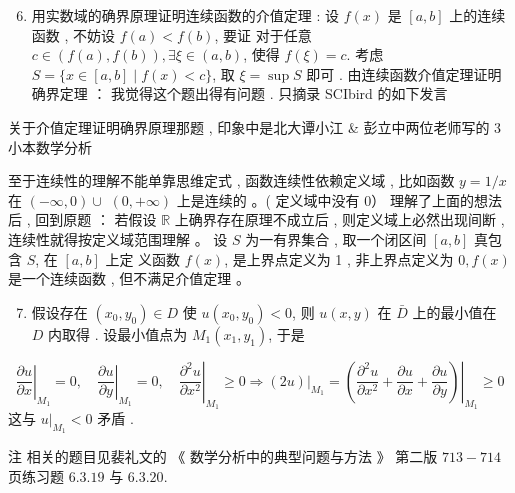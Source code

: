 \documentclass[10pt]{article}
\begin{document}
\begin{enumerate}
  \setcounter{enumi}{5}
  \item  用实数域的确界原理证明连续函数的介值定理 :  设  $f(x)$  是  $[a, b]$  上的连续函数 ,  不妨设  $f(a)<f(b)$,  要证   对于任意  $c \in(f(a), f(b)), \exists \xi \in(a, b)$,  使得  $f(\xi)=c$.  考虑  $S=\{x \in[a, b] \mid f(x)<c\}$,  取  $\xi=\sup S$  即可 .  由连续函数介值定理证明确界定理 ： 我觉得这个题出得有问题 .  只摘录  SCIbird  的如下发言 
\end{enumerate}
 关于介值定理证明确界原理那题 ,  印象中是北大谭小江  \&  彭立中两位老师写的  3  小本数学分析 

 至于连续性的理解不能单靠思维定式 ,  函数连续性依赖定义域 ,  比如函数  $y=1 / x$  在  $(-\infty, 0) \cup$ $(0,+\infty)$  上是连续的 。( 定义域中没有  $0 ）$  理解了上面的想法后 ,  回到原题 ： 若假设  $\mathbb{R}$  上确界存在原理不成立后 ,  则定义域上必然出现间断 ,  连续性就得按定义域范围理解 。 设  $S$  为一有界集合 ,  取一个闭区间  $[a, b]$  真包含  $S$,  在  $[a, b]$  上定   义函数  $f(x)$,  是上界点定义为  1 ,  非上界点定义为  $0, f(x)$  是一个连续函数 ,  但不满足介值定理 。

\begin{enumerate}
  \setcounter{enumi}{6}
  \item  假设存在  $\left(x_{0}, y_{0}\right) \in D$  使  $u\left(x_{0}, y_{0}\right)<0$,  则  $u(x, y)$  在  $\bar{D}$  上的最小值在  $D$  内取得 .  设最小值点为  $M_{1}\left(x_{1}, y_{1}\right)$,  于是 
\end{enumerate}
$$
\left.\frac{\partial u}{\partial x}\right|_{M_{1}}=0,\left.\quad \frac{\partial u}{\partial y}\right|_{M_{1}}=0,\left.\quad \frac{\partial^{2} u}{\partial x^{2}}\right|_{M_{1}} \geqslant\left. 0 \Longrightarrow(2 u)\right|_{M_{1}}=\left.\left(\frac{\partial^{2} u}{\partial x^{2}}+\frac{\partial u}{\partial x}+\frac{\partial u}{\partial y}\right)\right|_{M_{1}} \geqslant 0
$$
 这与  $\left.u\right|_{M_{1}}<0$  矛盾 .

 注   相关的题目见裴礼文的 《 数学分析中的典型问题与方法 》 第二版  $713-714$  页练习题  $6.3 .19$  与  $6.3 .20$.
\end{document}
